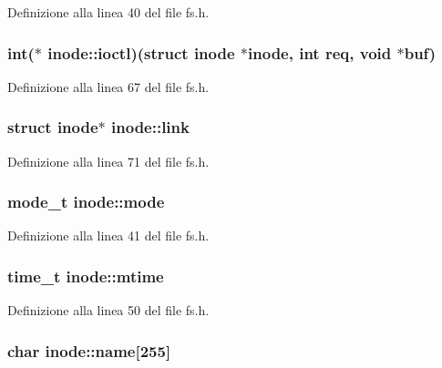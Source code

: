 Definizione alla linea 40 del file fs.\+h.

\hypertarget{structinode_a636843da203574bc338b016758bf8c7e}{
\subsubsection[{ioctl}]{\setlength{\rightskip}{0pt plus 5cm}int($\ast$ inode\+::ioctl)(struct {\bf inode} $\ast${\bf inode}, int req, void $\ast$buf)}}\label{structinode_a636843da203574bc338b016758bf8c7e}


Definizione alla linea 67 del file fs.\+h.

\hypertarget{structinode_a3533c53c5391601c66b3ae0f389c0843}{
\subsubsection[{link}]{\setlength{\rightskip}{0pt plus 5cm}struct {\bf inode}$\ast$ inode\+::link}}\label{structinode_a3533c53c5391601c66b3ae0f389c0843}


Definizione alla linea 71 del file fs.\+h.

\hypertarget{structinode_a4902d9f6a1d7bd79c6f1bb73d83ce8e3}{
\subsubsection[{mode}]{\setlength{\rightskip}{0pt plus 5cm}mode\+\_\+t inode\+::mode}}\label{structinode_a4902d9f6a1d7bd79c6f1bb73d83ce8e3}


Definizione alla linea 41 del file fs.\+h.

\hypertarget{structinode_a19f0d407fa2962c942e406d3e00c1da4}{
\subsubsection[{mtime}]{\setlength{\rightskip}{0pt plus 5cm}time\+\_\+t inode\+::mtime}}\label{structinode_a19f0d407fa2962c942e406d3e00c1da4}


Definizione alla linea 50 del file fs.\+h.

\hypertarget{structinode_ad64802d9d4ebdd1c56af5ab6e302faf0}{
\subsubsection[{name}]{\setlength{\rightskip}{0pt plus 5cm}char inode\+::name\mbox{[}255\mbox{]}}}\label{structinode_ad64802d9d4ebdd1c56af5ab6e302faf0}


